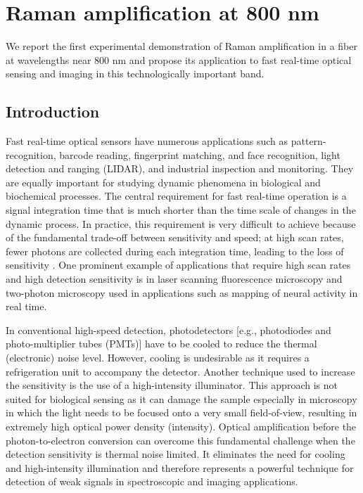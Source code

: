 \chapter{Raman amplification at 800 nm}

We report the first experimental demonstration of Raman amplification in a fiber at wavelengths near 800 nm and propose its application to fast real-time optical sensing and imaging in this technologically important band. 

\section{Introduction}

Fast real-time optical sensors have numerous applications such as pattern-recognition, barcode reading, fingerprint matching, and face recognition, light detection and ranging (LIDAR), and industrial inspection and monitoring. They are equally important for studying dynamic phenomena in biological and biochemical processes. The central requirement for fast real-time operation is a signal integration time that is much shorter than the time scale of changes in the dynamic process. In practice, this requirement is very difficult to achieve because of the fundamental trade-off between sensitivity and speed; at high scan rates, fewer photons are collected during each integration time, leading to the loss of sensitivity \cite{goda2009serial,goda2008amplified,goda2009theory}. One prominent example of applications that require high scan rates and high detection sensitivity is in laser scanning fluorescence microscopy and two-photon microscopy used in applications such as mapping of neural activity in real time.

In conventional high-speed detection, photodetectors [e.g., photodiodes and photo-multiplier tubes (PMTs)] have to be cooled to reduce the thermal (electronic) noise level. However, cooling is undesirable as it requires a refrigeration unit to accompany the detector. Another technique used to increase the sensitivity is the use of a high-intensity illuminator. This approach is not suited for biological sensing as it can damage the sample especially in microscopy in which the light needs to be focused onto a very small field-of-view, resulting in extremely high optical power density (intensity). Optical amplification before the photon-to-electron conversion can overcome this fundamental challenge when the detection sensitivity is thermal noise limited. It eliminates the need for cooling and high-intensity illumination and therefore represents a powerful technique for detection of weak signals in spectroscopic and imaging applications. 


